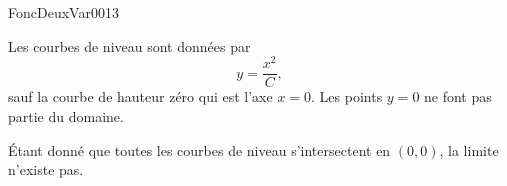 

\begin{corrige}{FoncDeuxVar0013}

	Les courbes de niveau sont données par
	\begin{equation}
		y=\frac{ x^2 }{ C },
	\end{equation}
	sauf la courbe de hauteur zéro qui est l'axe $x=0$. Les points $y=0$ ne font pas partie du domaine. 
    
	Étant donné que toutes les courbes de niveau s'intersectent en $(0,0)$, la limite n'existe pas.

\end{corrige}
